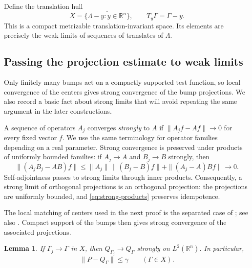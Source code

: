 \documentclass[a4paper,12pt,reqno]{amsart}
\newcommand{\lead}[1]{\par\smallskip\noindent\leavevmode#1\par\smallskip}
\newtheorem{lemma}[theorem]{Lemma}
\theoremstyle{remark}
\numberwithin{equation}{section}
\newcommand{\R}{\mathbb R}
\begin{document}
Define the translation hull
\[
 X=\overline{\{\Lambda-y:y\in\R^n\}},\qquad T_y\Gamma=\Gamma-y.
\]
This is a compact metrizable translation-invariant space. Its elements
are precisely the weak limits of sequences of translates of $\Lambda$.

\subsection{Passing the projection estimate to weak limits}

\lead{Only finitely many bumps act on a compactly supported test function,
so local convergence of the centers gives strong convergence of the bump
projections. We also record a basic fact about strong limits that will
avoid repeating the same argument in the later constructions.}


A sequence of operators $A_j$ converges \emph{strongly} to $A$ if
$\|A_jf-Af\|\to0$ for every fixed vector $f$. We use the same
terminology for operator families depending on a real parameter.
Strong convergence is preserved under products of uniformly bounded
families: if $A_j\to A$ and $B_j\to B$ strongly, then
\begin{equation}\label{eq:strong-products}
 \|(A_jB_j-AB)f\|
 \leq\|A_j\|\,\|(B_j-B)f\|+\|(A_j-A)Bf\|
 \longrightarrow0.
\end{equation}
Self-adjointness passes to strong limits through inner products.
Consequently, a strong limit of orthogonal projections is an orthogonal
projection: the projections are uniformly bounded, and
\eqref{eq:strong-products} preserves idempotence.

The local matching of centers used in the next proof is the separated
case of \cite[Proposition~2.3]{EnstadRaum}; see also
\cite[Lemma~2.2]{EnstadVanVelthoven}. Compact support of the bumps
then gives strong convergence of the associated projections.

\begin{lemma}\label{lem:strong-Q}
If $\Gamma_j\to\Gamma$ in $X$, then $Q_{\Gamma_j}\to Q_\Gamma$
strongly on $L^2(\R^n)$. In particular,
\begin{equation}\label{eq:hull-distance-bound}
 \|P-Q_\Gamma\|\leq\gamma\qquad(\Gamma\in X).
\end{equation}
\end{lemma}
\end{document}

